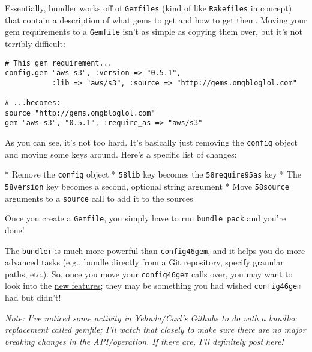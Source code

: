 \documentclass{book}
\begin{document}
Essentially, bundler works off of {\colorbox[rgb]{0.87,0.87,0.87}{\tt Gemfiles}} (kind of like {\colorbox[rgb]{0.87,0.87,0.87}{\tt Rakefiles}} in concept) that contain a description of what gems to get and how to get them. Moving your gem requirements to a {\colorbox[rgb]{0.87,0.87,0.87}{\tt Gemfile}} isn'{}t as simple as copying them over, but it'{}s not terribly difficult:

\begin{verbatim}# This gem requirement...
config.gem "aws-s3", :version => "0.5.1", 
           :lib => "aws/s3", :source => "http://gems.omgbloglol.com"

# ...becomes:
source "http://gems.omgbloglol.com"
gem "aws-s3", "0.5.1", :require_as => "aws/s3"\end{verbatim}
As you can see, it'{}s not too hard. It'{}s basically just removing the {\colorbox[rgb]{0.87,0.87,0.87}{\tt config}} object and moving some keys around. Here'{}s a specific list of changes:

* Remove the {\colorbox[rgb]{0.87,0.87,0.87}{\tt config}} object * {\colorbox[rgb]{0.87,0.87,0.87}{\tt \char58lib}} key becomes the {\colorbox[rgb]{0.87,0.87,0.87}{\tt \char58require\char95as}} key * The {\colorbox[rgb]{0.87,0.87,0.87}{\tt \char58version}} key becomes a second, optional string argument * Move {\colorbox[rgb]{0.87,0.87,0.87}{\tt \char58source}} arguments to a {\colorbox[rgb]{0.87,0.87,0.87}{\tt source}} call to add it to the sources

Once you create a {\colorbox[rgb]{0.87,0.87,0.87}{\tt Gemfile}}, you simply have to run {\colorbox[rgb]{0.87,0.87,0.87}{\tt bundle~pack}} and you'{}re done!

The {\colorbox[rgb]{0.87,0.87,0.87}{\tt bundler}} is much more powerful than {\colorbox[rgb]{0.87,0.87,0.87}{\tt config\char46gem}}, and it helps you do more advanced tasks (e.g., bundle directly from a Git repository, specify granular paths, etc.). So, once you move your {\colorbox[rgb]{0.87,0.87,0.87}{\tt config\char46gem}} calls over, you may want to look into the \href{http://github.com/carlhuda/bundler/blob/master/README.markdown}{new features}; they may be something you had wished {\colorbox[rgb]{0.87,0.87,0.87}{\tt config\char46gem}} had but didn'{}t!

\emph{Note: I'{}ve noticed some activity in Yehuda/Carl'{}s Githubs to do with a bundler replacement called gemfile; I'{}ll watch that closely to make sure there are no major breaking changes in the API/operation. If there are, I'{}ll definitely post here!}
\end{document}
